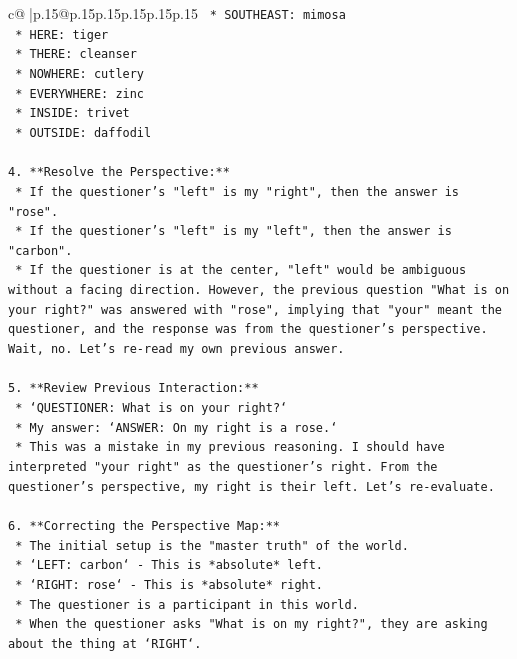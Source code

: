 \documentclass{article}
\begin{document}
{\begin{supertabular}{c@{$\;$}|p{.15\linewidth}@{}p{.15\linewidth}p{.15\linewidth}p{.15\linewidth}p{.15\linewidth}p{.15\linewidth}}
{{{\texttt{        *   SOUTHEAST: mimosa} \\
\texttt{        *   HERE: tiger} \\
\texttt{        *   THERE: cleanser} \\
\texttt{        *   NOWHERE: cutlery} \\
\texttt{        *   EVERYWHERE: zinc} \\
\texttt{        *   INSIDE: trivet} \\
\texttt{        *   OUTSIDE: daffodil} \\
\\ 
\texttt{4.  **Resolve the Perspective:**} \\
\texttt{    *   If the questioner's "left" is my "right", then the answer is "rose".} \\
\texttt{    *   If the questioner's "left" is my "left", then the answer is "carbon".} \\
\texttt{    *   If the questioner is at the center, "left" would be ambiguous without a facing direction. However, the previous question "What is on your right?" was answered with "rose", implying that "your" meant the questioner, and the response was from the questioner's perspective. Wait, no. Let's re{-}read my own previous answer.} \\
\\ 
\texttt{5.  **Review Previous Interaction:**} \\
\texttt{    *   `QUESTIONER: What is on your right?`} \\
\texttt{    *   My answer: `ANSWER: On my right is a rose.`} \\
\texttt{    *   This was a mistake in my previous reasoning. I should have interpreted "your right" as the questioner's right. From the questioner's perspective, my right is their left. Let's re{-}evaluate.} \\
\\ 
\texttt{6.  **Correcting the Perspective Map:**} \\
\texttt{    *   The initial setup is the "master truth" of the world.} \\
\texttt{    *   `LEFT: carbon` {-} This is *absolute* left.} \\
\texttt{    *   `RIGHT: rose` {-} This is *absolute* right.} \\
\texttt{    *   The questioner is a participant in this world.} \\
\texttt{    *   When the questioner asks "What is on my right?", they are asking about the thing at `RIGHT`.} \\
}}}
\end{supertabular}}
\end{document}
